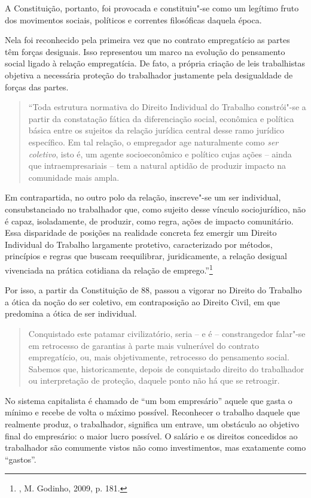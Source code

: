 A Constituição, portanto, foi provocada e constituiu"-se como um legítimo
fruto dos movimentos sociais, políticos e correntes filosóficas daquela
época.

Nela foi reconhecido pela primeira vez que no contrato empregatício as
partes têm forças desiguais. Isso representou um marco na evolução do
pensamento social ligado à relação empregatícia. De fato, a própria
criação de leis trabalhistas objetiva a necessária proteção do
trabalhador justamente pela desigualdade de forças das partes.

\begin{quote}
``Toda estrutura normativa do Direito Individual do Trabalho constrói"-se
a partir da constatação fática da diferenciação social, econômica e
política básica entre os sujeitos da relação jurídica central desse ramo
jurídico específico. Em tal relação, o empregador age naturalmente como
\emph{ser coletivo}, isto é, um agente socioeconômico e político cujas
ações -- ainda que intraempresariais -- tem a natural aptidão de
produzir impacto na comunidade mais ampla.
\end{quote}

Em contrapartida, no outro polo da relação, inscreve"-se um ser
individual, consubstanciado no trabalhador que, como sujeito desse
vínculo sociojurídico, não é capaz, isoladamente, de produzir, como
regra, ações de impacto comunitário. Essa disparidade de posições na
realidade concreta fez emergir um Direito Individual do Trabalho
largamente protetivo, caracterizado por métodos, princípios e regras que
buscam reequilibrar, juridicamente, a relação desigual vivenciada na
prática cotidiana da relação de emprego.''\footnote{, M. Godinho,
  2009, p. 181.}

Por isso, a partir da Constituição de 88, passou a vigorar no Direito do
Trabalho a ótica da noção do ser coletivo, em contraposição ao Direito
Civil, em que predomina a ótica de ser individual.

\begin{quote}
Conquistado este patamar civilizatório, seria -- e é -- constrangedor
falar"-se em retrocesso de garantias à parte mais vulnerável do contrato
empregatício, ou, mais objetivamente, retrocesso do pensamento social.
Sabemos que, historicamente, depois de conquistado direito do
trabalhador ou interpretação de proteção, daquele ponto não há que se
retroagir.
\end{quote}

No sistema capitalista é chamado de ``um bom empresário'' aquele que
gasta o mínimo e recebe de volta o máximo possível. Reconhecer o
trabalho daquele que realmente produz, o trabalhador, significa um
entrave, um obstáculo ao objetivo final do empresário: o maior lucro
possível. O salário e os direitos concedidos ao trabalhador são
comumente vistos não como investimentos, mas exatamente como ``gastos''.

